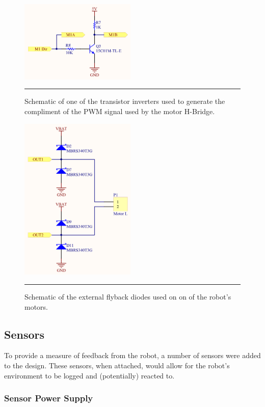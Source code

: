 \begin{figure}[tbph]
	\centering
		\includegraphics[width=55mm]{./Figures/TransistorInverter.png}
	\rule{35em}{0.5pt}
	\caption[Transistor Inverter Schematic]{Schematic of one of the transistor inverters used to generate the compliment of the PWM signal used by the motor H-Bridge.}
	\label{fig:transistorinverter}
\end{figure}

\begin{figure}[tbph]
	\centering
		\includegraphics[width=55mm]{./Figures/FlybackDiodes.png}
	\rule{35em}{0.5pt}
	\caption[Motor Flyback Diodes Schematic]{Schematic of the external flyback diodes used on on of the robot's motors.}
	\label{fig:flybackdiodes}
\end{figure}

\FloatBarrier
\subsection{Sensors}

To provide a measure of feedback from the robot, a number of sensors were added to the design. These sensors, when attached, would allow for the robot's environment to be logged and (potentially) reacted to.

\FloatBarrier
\subsubsection{Sensor Power Supply}

